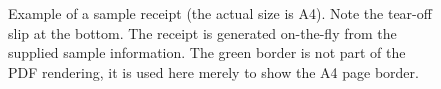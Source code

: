 \documentclass[12pt,twoside]{article}
\begin{document}
\begin{enumerate}[(i)]
\begin{figure}[!h]
\begin{center}
\caption{Example of a sample receipt (the actual size is A4).
Note the tear-off slip at the bottom. The receipt is generated
on-the-fly from the supplied sample information. The green border
is not part of the PDF rendering, it is used here merely to show
the A4 page border.\label{fig:samplereceipt}}
\end{center}
\end{figure}


\end{enumerate}
\end{document}
